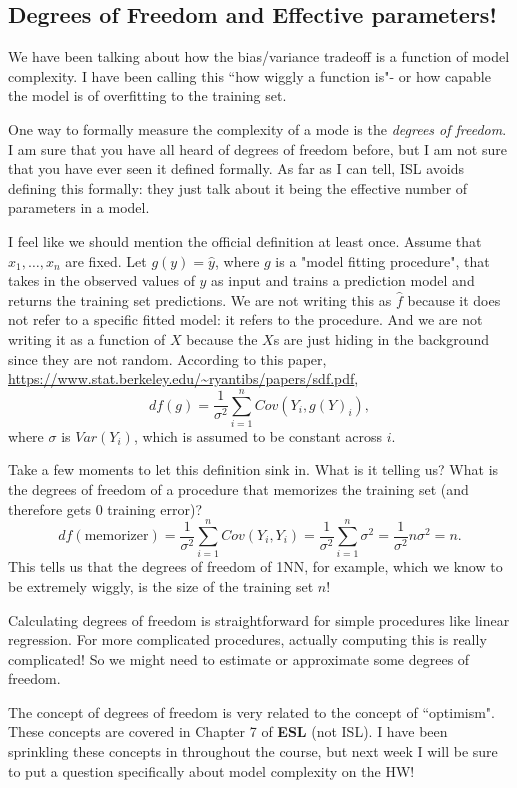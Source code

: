 \subsection{Degrees of Freedom and Effective parameters!}

We have been talking about how the bias/variance tradeoff is a function of model complexity. I have been calling this ``how wiggly a function is"- or how capable the model is of overfitting to the training set. 

One way to formally measure the complexity of a mode is the \emph{degrees of freedom}. I am sure that you have all heard of degrees of freedom before, but I am not sure that you have ever seen it defined formally. As far as I can tell, ISL avoids defining this formally: they just talk about it being the effective number of parameters in a model. 

I feel like we should mention the official definition at least once. Assume that $x_1,\ldots,x_n$ are fixed. Let $g(y) = \hat{y}$, where $g$ is a "model fitting procedure", that takes in the observed values of $y$ as input and trains a prediction model and returns the training set predictions. We are not writing this as $\hat{f}$ because it does not refer to a specific fitted model: it refers to the procedure. And we are not writing it as a function of $X$ because the $X$s are just hiding in the background since they are not random. According to this paper, \url{https://www.stat.berkeley.edu/~ryantibs/papers/sdf.pdf}, 
$$
df(g) = \frac{1}{\sigma^2} \sum_{i=1}^n Cov(Y_i, g(Y)_i),
$$
where $\sigma$ is $Var(Y_i)$, which is assumed to be constant across $i$. 

Take a few moments to let this definition sink in. What is it telling us? What is the degrees of freedom of a procedure that memorizes the training set (and therefore gets 0 training error)? 
$$
df(\text{memorizer}) =  \frac{1}{\sigma^2} \sum_{i=1}^n Cov(Y_i, Y_i) = \frac{1}{\sigma^2} \sum_{i=1}^n \sigma^2 = \frac{1}{\sigma^2} n \sigma^2 = n.
$$
This tells us that the degrees of freedom of 1NN, for example, which we know to be extremely wiggly, is the size of the training set $n$!

Calculating degrees of freedom is straightforward for simple procedures like linear regression. For more complicated procedures, actually computing this is really complicated! So we might need to estimate or approximate some degrees of freedom. 

The concept of degrees of freedom is very related to the concept of ``optimism". These concepts are covered in Chapter 7 of \textbf{ESL} (not ISL). I have been sprinkling these concepts in throughout the course, but next week I will be sure to put a question specifically about model complexity on the HW! 

